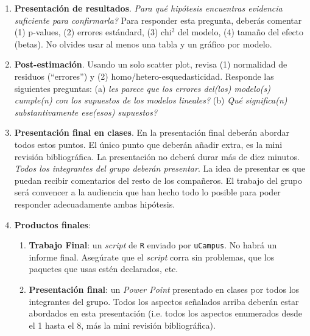 \documentclass[10pt]{article}
\begin{document}
\begin{enumerate}
	\item {\bf Presentaci\'on de resultados}. \emph{Para qu\'e hip\'otesis encuentras evidencia suficiente para confirmarla?} Para responder esta pregunta, deber\'as comentar (1) p-values, (2) errores est\'andard, (3) chi$^{2}$ del modelo, (4) tama\~no del efecto (betas). No olvides usar al menos una tabla y un gr\'afico por modelo.

	\item {\bf Post-estimaci\'on}. Usando un solo scatter plot, revisa (1) normalidad de residuos (``errores'') y (2) homo/hetero-esquedasticidad. Responde las siguientes preguntas: (a) \emph{les parece que los errores del(los) modelo(s) cumple(n) con los supuestos de los modelos lineales?} (b) \emph{Qu\'e significa(n) substantivamente ese(esos) supuestos?}

	\item {\bf Presentaci\'on final en clases}. En la presentaci\'on final deber\'an abordar todos estos puntos. El \'unico punto que deber\'an a\~nadir extra, es la mini revisi\'on bibliogr\'afica. La presentaci\'on no deber\'a durar m\'as de diez minutos. \emph{Todos los integrantes del grupo deber\'an presentar}. La idea de presentar es que puedan recibir comentarios del resto de los compa\~neros. El trabajo del grupo ser\'a convencer a la audiencia que han hecho todo lo posible para poder responder adecuadamente ambas hip\'otesis.

	\item {\bf Productos finales}: 

		\begin{enumerate}
			\item {\bf Trabajo Final}: un \emph{script} de \texttt{R} enviado por \texttt{uCampus}. No habr\'a un informe final. Aseg\'urate que el \emph{script} corra sin problemas, que los paquetes que usas est\'en declarados, etc.
			\item {\bf Presentaci\'on final}: un \emph{Power Point} presentado en clases por todos los integrantes del grupo. Todos los aspectos se\~nalados arriba deber\'an estar abordados en esta presentaci\'on (i.e. todos los aspectos enumerados desde el 1 hasta el 8, m\'as la mini revisi\'on bibliogr\'afica).
		\end{enumerate}

\end{enumerate}
\end{document}
